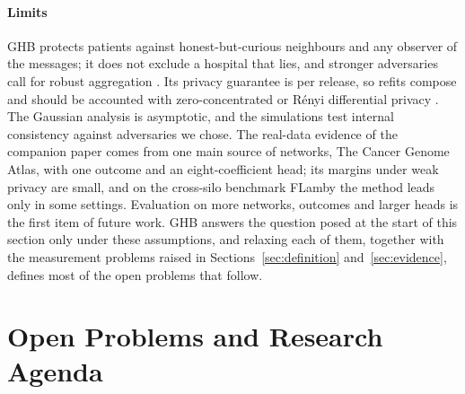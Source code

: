 \documentclass[acmsmall,screen,review]{acmart}
\theoremstyle{acmdefinition}
\begin{document}
\paragraph{Limits} GHB protects patients against honest-but-curious neighbours and any observer of the messages; it does not exclude a hospital that lies, and stronger adversaries call for robust aggregation \cite{blanchard2017machine}. Its privacy guarantee is per release, so refits compose and should be accounted with zero-concentrated or R\'{e}nyi differential privacy \cite{bun2016concentrated,mironov2017renyi}. The Gaussian analysis is asymptotic, and the simulations test internal consistency against adversaries we chose. The real-data evidence of the companion paper \cite{simoes2026ghb} comes from one main source of networks, The Cancer Genome Atlas, with one outcome and an eight-coefficient head; its margins under weak privacy are small, and on the cross-silo benchmark FLamby \cite{ogierduterrail2022flamby} the method leads only in some settings. Evaluation on more networks, outcomes and larger heads is the first item of future work. GHB answers the question posed at the start of this section only under these assumptions, and relaxing each of them, together with the measurement problems raised in Sections~\ref{sec:definition} and~\ref{sec:evidence}, defines most of the open problems that follow.

\section{Open Problems and Research Agenda}\label{sec:agenda}
\end{document}
